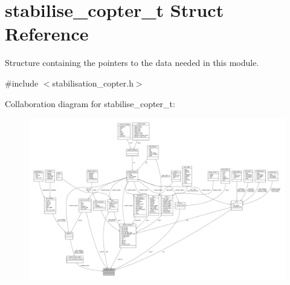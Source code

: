 \hypertarget{structstabilise__copter__t}{\section{stabilise\+\_\+copter\+\_\+t Struct Reference}
\label{structstabilise__copter__t}
}


Structure containing the pointers to the data needed in this module.  




{\ttfamily \#include $<$stabilisation\+\_\+copter.\+h$>$}



Collaboration diagram for stabilise\+\_\+copter\+\_\+t\+:
\nopagebreak
\begin{figure}[H]
\begin{center}
\leavevmode
\includegraphics[width=350pt]{structstabilise__copter__t__coll__graph}
\end{center}
\end{figure}
